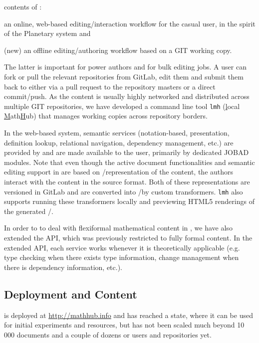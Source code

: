 contents of \sys: 
\begin{compactenum}[\em i\rm)]
\item an online, web-based editing/interaction workflow for the casual user, in the spirit
  of the Planetary system and
\item (new) an offline editing/authoring workflow based on a GIT working copy.
\end{compactenum}
The latter is important for power authors and for bulk editing jobs. A user can fork or
pull the relevant repositories from GitLab, edit them and submit them back to \sys
either via a pull request to the repository masters or a direct commit/push. As the
content is usually highly networked and distributed across multiple GIT repositories, we
have developed a command line tool \texttt{lmh} (\underline{l}ocal
\underline{M}ath\underline{H}ub) that manages working copies across repository
borders. 

In the web-based system, semantic services (notation-based, presentation, definition
lookup, relational navigation, dependency management, etc.) are provided by \mmt and are
made available to the user, primarily by dedicated JOBAD~\cite{GLR:WebSvcActMathDoc09}
modules.  Note that even though the active document functionalities and semantic editing
support in \sys are based on \omdoc/\mmt representation of the content, the
authors interact with the content in the source format. Both of these representations are
versioned in GitLab and are converted into \omdoc/\mmt by custom
transformers. \texttt{lmh} also supports running these transformers locally and previewing
HTML5 renderings of the generated \omdoc/\mmt.

In order to to deal with flexiformal mathematical content in \omdoc, we have also extended
the \mmt API, which was previously restricted to fully formal content. In the extended
\mmt API, each \mmt service works whenever it is theoretically applicable (e.g. type
checking when there exists type information, change management when there is dependency
information, etc.).

\subsection{Deployment and Content}

\sys is deployed at \url{http://mathhub.info} and has reached a state, where it can be
used for initial experiments and resources, but has not been scaled much beyond 10\,000
documents and a couple of dozens or users and repositories yet.

